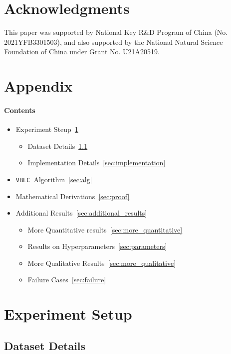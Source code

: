\documentclass[letterpaper]{article} \usepackage{aaai23}  \usepackage{times}  \usepackage{helvet}  \usepackage{courier}  \usepackage[hyphens]{url}  \usepackage{graphicx} \urlstyle{rm} \def\UrlFont{\rm}  \usepackage{natbib}  \usepackage{caption} \frenchspacing  \setlength{\pdfpagewidth}{8.5in}  \setlength{\pdfpageheight}{11in}  \usepackage{algorithm}
\newcommand{\method}{\texttt{VBLC}~}
\begin{document}
\section*{Acknowledgments}
This paper was supported by National Key R\&D Program of China (No. 2021YFB3301503), and also supported by the National Natural Science Foundation of China under Grant No. U21A20519.



\clearpage

\appendix
\section*{Appendix}

\paragraph{Contents}
\begin{itemize}
    \item Experiment Steup~\ref{sec:experiemnt_steup}
    \begin{itemize}
      \item Dataset Details~\ref{sec:dataset}
      \item Implementation Details~\ref{sec:implementation}
    \end{itemize}
    \item \method Algorithm~\ref{sec:alg}
    \item Mathematical Derivations~\ref{sec:proof}
    \item Additional Results~\ref{sec:additional_results}
    \begin{itemize}
      \item More Quantitative results~\ref{sec:more_quantitative}
      \item Results on Hyperparameters~\ref{sec:parameters}
      \item More Qualitative Results~\ref{sec:more_qualitative}
      \item Failure Cases~\ref{sec:failure}
    \end{itemize}
\end{itemize}

\section{Experiment Setup}
\label{sec:experiemnt_steup}

\subsection{Dataset Details}
\label{sec:dataset}
\end{document}
